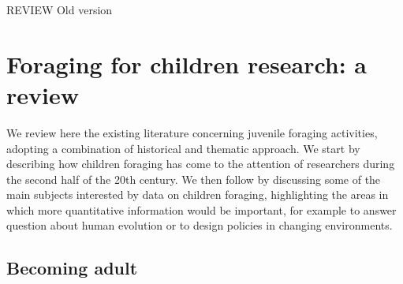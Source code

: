  
 



REVIEW
Old version
\section{Foraging for children research: a review}

We review here the existing literature concerning juvenile foraging activities, adopting a combination of historical and thematic approach. We start by describing how children foraging has come to the attention of researchers during the second half of the 20th century. We then follow by discussing some of the main subjects interested by data on children foraging, highlighting the areas in which more quantitative information would be important, for example to answer question about human evolution or to design policies in changing environments.

\subsection{Becoming adult}

